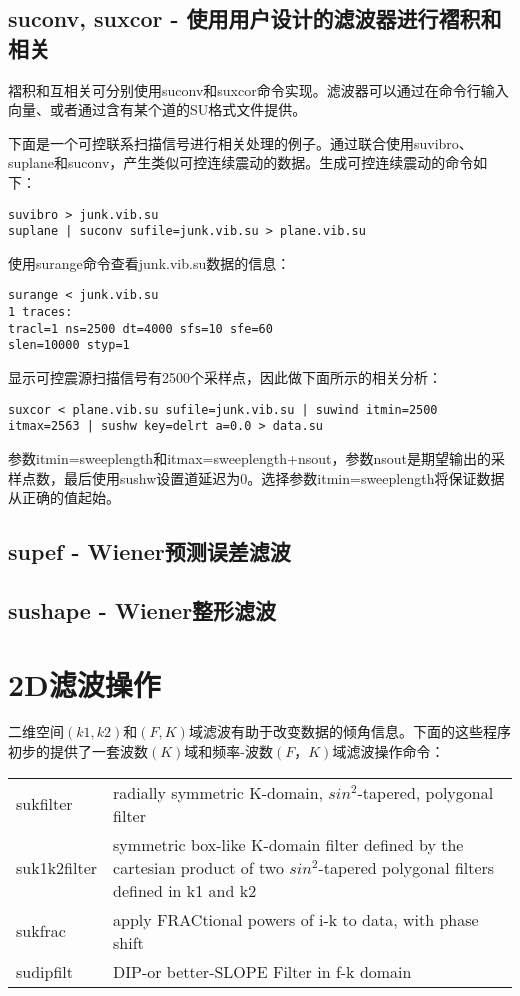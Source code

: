 \subsection{suconv, suxcor - 使用用户设计的滤波器进行褶积和相关}
褶积和互相关可分别使用suconv和suxcor命令实现。滤波器可以通过在命令行输入向量、或者通过含有某个道的SU格式文件提供。\par
下面是一个可控联系扫描信号进行相关处理的例子。通过联合使用suvibro、suplane和suconv，产生类似可控连续震动的数据。生成可控连续震动的命令如下：
\begin{lstlisting}
suvibro > junk.vib.su
suplane | suconv sufile=junk.vib.su > plane.vib.su
\end{lstlisting}
使用surange命令查看junk.vib.su数据的信息：
\begin{lstlisting}
surange < junk.vib.su
1 traces:
tracl=1 ns=2500 dt=4000 sfs=10 sfe=60
slen=10000 styp=1
\end{lstlisting}
显示可控震源扫描信号有2500个采样点，因此做下面所示的相关分析：
\begin{lstlisting}
suxcor < plane.vib.su sufile=junk.vib.su | suwind itmin=2500 itmax=2563 | sushw key=delrt a=0.0 > data.su
\end{lstlisting}
参数itmin=sweeplength和itmax=sweeplength+nsout，参数nsout是期望输出的采样点数，最后使用sushw设置道延迟为0。选择参数itmin=sweeplength将保证数据从正确的值起始。

\subsection{supef - Wiener预测误差滤波}
\subsection{sushape - Wiener整形滤波}

\section{2D滤波操作}
二维空间$(k1,k2)$和$(F,K)$域滤波有助于改变数据的倾角信息。下面的这些程序初步的提供了一套波数$(K)$域和频率-波数$(F，K)$域滤波操作命令：\par
\begin{tabular}{lp{}}
	\toprule
	sukfilter & radially symmetric K-domain, $sin^2$-tapered, polygonal filter\\
	suk1k2filter & symmetric box-like K-domain filter defined by the cartesian product of two $sin^2$-tapered polygonal filters defined in k1 and k2\\
	sukfrac  & apply FRACtional powers of i-k to data, with phase shift\\
	sudipfilt & DIP-or better-SLOPE Filter in f-k domain\\
	\bottomrule
\end{tabular}
